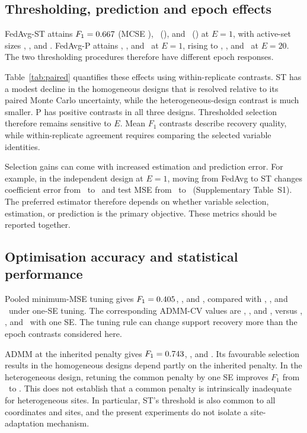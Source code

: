\subsection{Thresholding, prediction and epoch effects}

FedAvg-ST attains $F_1=0.667$ (MCSE \MIndStSe), \MCorStF\
(\MCorStSe), and \MHetStF\ (\MHetStSe) at $E=1$, with active-set
sizes \MIndStAct, \MCorStAct, and \MHetStAct. FedAvg-P attains
\MIndProxF, \MCorProxF, and \MHetProxF\ at $E=1$, rising to
\MIndProxTF, \MCorProxTF, and \MHetProxTF\ at $E=20$.
The two thresholding procedures therefore have different epoch responses.

Table~\ref{tab:paired} quantifies these effects using within-replicate
contrasts. ST has a modest decline in the homogeneous designs that is
resolved relative to its paired Monte Carlo uncertainty, while the
heterogeneous-design contrast is much smaller. P has positive contrasts
in all three designs. Thresholded selection therefore remains sensitive to $E$. Mean $F_1$
contrasts describe recovery quality, while within-replicate agreement
requires comparing the selected variable identities.



Selection gains can come with increased estimation and prediction error.
For example, in the independent design at $E=1$, moving from FedAvg to ST
changes coefficient error from \MIndFedErr\ to \MIndStErr\ and test MSE
from \MIndFedMse\ to \MIndStMse\ (Supplementary Table~S1). The preferred estimator therefore
depends on whether variable selection, estimation, or prediction is the
primary objective. These metrics should be reported together.

\subsection{Optimisation accuracy and statistical performance}

Pooled minimum-MSE tuning gives $F_1=0.405$, \MCorPoolF, and
\MHetPoolF, compared with \MIndPoolSeF, \MCorPoolSeF, and
\MHetPoolSeF\ under one-SE tuning. The corresponding ADMM-CV values
are \MIndAdmmCvF, \MCorAdmmCvF, and \MHetAdmmCvF, versus
\MIndAdmmCvSeF, \MCorAdmmCvSeF, and \MHetAdmmCvSeF\ with one SE.
The tuning rule can change support recovery more than the epoch contrasts
considered here.

ADMM at the inherited penalty gives $F_1=0.743$, \MCorAdmmF,
and \MHetAdmmF. Its favourable selection results in the homogeneous
designs depend partly on the inherited penalty. In the heterogeneous
design, retuning the common penalty by one SE improves $F_1$ from
\MHetAdmmF\ to \MHetAdmmCvSeF. This does not establish that a common
penalty is intrinsically inadequate for heterogeneous sites. In particular,
ST's threshold is also common to all coordinates and sites, and the present
experiments do not isolate a site-adaptation mechanism.

